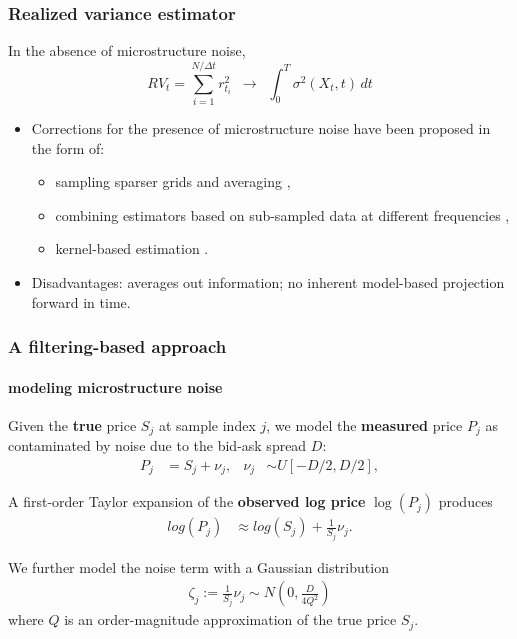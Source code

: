 \documentclass{beamer}
\begin{document}
\begin{frame}
  \frametitle{Realized variance estimator}
  In the absence of microstructure noise, 
  \[
    RV_t = \sum_{i=1}^{N/\Delta t} r_{t_i}^2 \,\,\, \to \,\,\, \displaystyle \int_{0}^T \sigma^2\left(X_t, t\right)\, dt
  \]
  
  \begin{itemize}
  \item Corrections for the presence of microstructure noise have been
    proposed in the form of:
    \begin{itemize}
    \item sampling sparser grids and averaging \cite{zhang2005tale},
    \item combining estimators based on sub-sampled data at different frequencies \cite{ait2011ultra},
    \item kernel-based estimation \cite{hansen2006realized, barndorff2008designing}.
    \end{itemize}
  \item Disadvantages: averages out information; no inherent
    model-based projection forward in time.
  \end{itemize}
\end{frame}
\begin{frame}
  \frametitle{A filtering-based approach}
  \framesubtitle{modeling microstructure noise}

  Given the \textbf{true} price $S_j$ at sample index $j$, we model
  the \textbf{measured} price $P_j$ as contaminated by noise due to
  the bid-ask spread $D$:
  \begin{align*}
    P_j &= S_j + \nu_j,& \nu_j &\sim U[-D/2, D/2],
  \end{align*}

  A first-order Taylor expansion of the \textbf{observed log price} $\log(P_j)$ produces
  \begin{align*}
    log(P_j) &\approx log(S_j) + \frac{1}{S_j}\nu_j.
  \end{align*}

  We further model the noise term with a Gaussian distribution
  \begin{align*}
    \zeta_j := \frac{1}{S_j}\nu_j \sim N\left(0, \frac{D}{4Q^2} \right)
  \end{align*}
  where $Q$ is an order-magnitude approximation of the true price
  $S_j$.
\end{frame}
\end{document}
